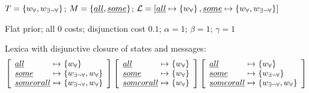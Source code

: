 \documentclass{article}
\begin{document}
\begin{examples}
\item $T = \left\{ w_{\forall}, w_{\exists\neg\forall} \right\}$; $M = \left\{ \emph{all}, \emph{some} \right\}$; $\mathcal{L} = [\emph{all} \mapsto \left\{ w_{\forall} \right\}, \emph{some} \mapsto \left\{ w_{\forall},w_{\exists\neg\forall} \right\}]$
\item Flat prior; all $0$ costs; disjunction cost $0.1$; $\alpha = 1$; $\beta = 1$; $\gamma = 1$  
\item Lexica with disjunctive closure of states and messages:
  \setlength{\arraycolsep}{2pt}
  \[
  \left[
    \begin{array}[c]{l@{ \ \mapsto \ } l}
      \mAll & \set{\wALL} \\
      \mSome & \set{\wSOMENOTALL,\wALL} \\
      \mSomevAll & \set{\wSOMENOTALL, \wALL} \\
    \end{array}
  \right]
  \hfill
  \left[
  \begin{array}[c]{l@{ \ \mapsto \ } l}
    \mAll & \set{\wALL} \\
    \mSome & \set{\wALL} \\
    \mSomevAll & \set{\wALL} \\
  \end{array}
  \right]
  \hfill
  \left[
  \begin{array}[c]{l@{ \ \mapsto \ } l}
    \mAll & \set{\wALL} \\
    \mSome & \set{\wSOMENOTALL} \\
    \mSomevAll & \set{\wSOMENOTALL, \wALL} \\
  \end{array}
  \right]
  \]
\end{examples}
\end{document}
